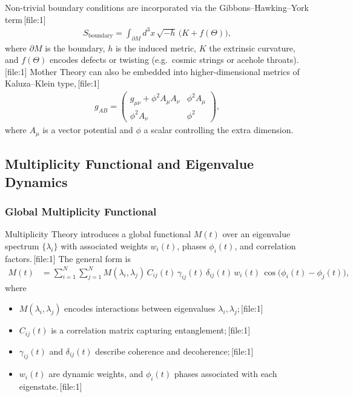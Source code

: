 \documentclass[11pt]{article}
\begin{document}
Non-trivial boundary conditions are incorporated via the Gibbons--Hawking--York term\,[file:1]
\begin{align}
S_{\mathrm{boundary}}
=
\int_{\partial M} d^3x\,\sqrt{-h}\,\bigl(K+f(\Theta)\bigr),
\end{align}
where \(\partial M\) is the boundary, \(h\) is the induced metric, \(K\) the extrinsic curvature, and \(f(\Theta)\) encodes defects or twisting (e.g.\ cosmic strings or acehole throats).\,[file:1] Mother Theory can also be embedded into higher-dimensional metrics of Kaluza--Klein type,\,[file:1]
\begin{align}
g_{AB}
=
\begin{pmatrix}
g_{\mu\nu}+\phi^{2} A_{\mu} A_{\nu} & \phi^{2} A_{\mu}\\
\phi^{2} A_{\nu} & \phi^{2}
\end{pmatrix},
\end{align}
where \(A_\mu\) is a vector potential and \(\phi\) a scalar controlling the extra dimension.

\subsection{Multiplicity Functional and Eigenvalue Dynamics}

\subsubsection{Global Multiplicity Functional}

Multiplicity Theory introduces a global functional \(M(t)\) over an eigenvalue spectrum \(\{\lambda_i\}\) with associated weights \(w_i(t)\), phases \(\phi_i(t)\), and correlation factors.\,[file:1] The general form is
\begin{align}
M(t)
&=
\sum_{i=1}^{N}\sum_{j=1}^{N}
M(\lambda_i,\lambda_j)\,
C_{ij}(t)\,
\gamma_{ij}(t)\,
\delta_{ij}(t)\,
w_i(t)\,
\cos\bigl(\phi_i(t)-\phi_j(t)\bigr),
\label{eq:Multiplicity}
\end{align}
where
\begin{itemize}
  \item \(M(\lambda_i,\lambda_j)\) encodes interactions between eigenvalues \(\lambda_i,\lambda_j\);\,[file:1]
  \item \(C_{ij}(t)\) is a correlation matrix capturing entanglement;\,[file:1]
  \item \(\gamma_{ij}(t)\) and \(\delta_{ij}(t)\) describe coherence and decoherence;\,[file:1]
  \item \(w_i(t)\) are dynamic weights, and \(\phi_i(t)\) phases associated with each eigenstate.\,[file:1]
\end{itemize}
\end{document}

